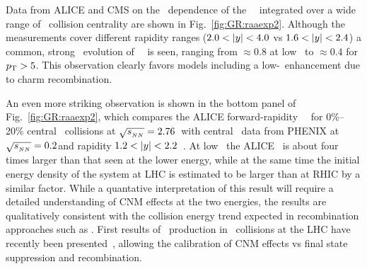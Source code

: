 Data from ALICE and CMS on the \pT\ dependence of the \jpsi\ \Raa\ integrated over a wide range of \PbPb\ collision centrality
are shown in Fig.~\ref{fig:GR:raaexp2}. Although the measurements 
cover different rapidity ranges ($2.0 < |y| < 4.0$ vs $ 1.6  < |y| < 2.4 $)
a common, strong \pT\ evolution of \jpsi\ \Raa\ is seen, ranging from $\approx 0.8$ at low \pT\ to $\approx 0.4$ for $\mbox{$p_{\mathrm{T}}$} > 5$\GeVc.
This observation clearly favors models including a low-\pT\ enhancement due to charm recombination.

An even more striking observation is shown in the bottom panel of Fig.~\ref{fig:GR:raaexp2}, which compares 
the ALICE forward-rapidity \jpsi\ \Raa\ for 0\%--20\% central \PbPb\ collisions at  $\sqrt{s_{_{NN}}} = 2.76$\TeV\
with central \AuAu\ data from PHENIX at $\sqrt{s_{_{NN}}} = 0.2$\GeV and rapidity $1.2 < |y| < 2.2$~\cite{Adare:2011yf}.
At low \pT\ the ALICE \Raa\ is about four times larger than that seen at the lower energy, while 
at the same time the initial energy density of the system at LHC is estimated to be larger than at 
RHIC by a similar factor. While a quantative interpretation of this result will require 
a detailed understanding of CNM effects at the two energies, the results are qualitatively consistent 
with the collision energy trend expected in recombination approaches such as
\cite{Zhao:2007hh,Zhou:2013aea,Liu:2009nb}.
First results of \jpsi\ production in \pPb\ collisions at the LHC have recently 
been presented~\cite{Abelev:2013yxa,Aaij:2013zxa}, allowing
the calibration of CNM effects vs final state suppression and recombination.

